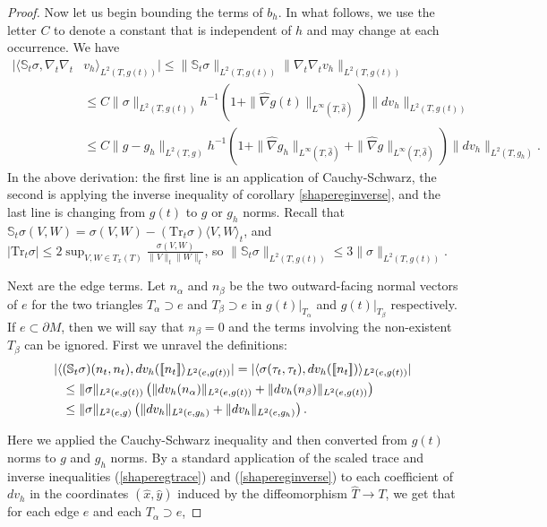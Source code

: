 \documentclass[11pt]{article}
\newcommand{\iprod}[1]{\langle #1 \rangle}
\begin{document}
\begin{proof}
Now let us begin bounding the terms of $b_h$. In what follows, we use the letter $C$ to denote a constant that is independent of $h$ and may change at each occurrence.  We have
\begin{align*}|\iprod{\mathbb{S}_t\sigma,\nabla_t\nabla_t & v_h}_{L^2(T,g(t))}| \le \|\mathbb{S}_t\sigma\|_{L^2(T,g(t))}\|\nabla_t\nabla_t v_h\|_{L^2(T,g(t))}\\
&\le C \|\sigma\|_{L^2(T,g(t))}h^{-1}\left(1 + \|\hat \nabla g(t)\|_{L^\infty(T,\hat \delta)}\right)\|dv_h\|_{L^2(T,g(t))} \\
&\le C\|g - g_h\|_{L^2(T,g)}h^{-1}\left(1 + \|\hat \nabla g_h\|_{L^\infty(T,\hat \delta)} + \|\hat \nabla g\|_{L^\infty(T,\hat \delta)}\right)\|dv_h\|_{L^2(T,g_h)}.
\end{align*}
In the above derivation: the first line is an application of Cauchy-Schwarz, the second is applying the inverse inequality of corollary \ref{shapereginverse}, and the last line is changing from $g(t)$ to $g$ or $g_h$ norms. Recall that $\mathbb{S}_t\sigma(V,W) = \sigma(V,W) - (\mathrm{Tr}_t\sigma)\iprod{V,W}_t$, and $|\mathrm{Tr}_t\sigma| \le 2 \sup_{V,W \in T_x(T)} \frac{\sigma(V,W)}{\|V\|_t\|W\|_t}$, so $\|\mathbb{S}_t\sigma\|_{L^2(T,g(t))} \le 3\|\sigma\|_{L^2(T,g(t))}$.

Next are the edge terms. Let $n_\alpha$ and $n_\beta$ be the two outward-facing normal vectors of $e$ for the two triangles $T_\alpha \supset e$ and $T_\beta \supset e$ in $g(t)|_{T_\alpha}$ and $g(t)|_{T_\beta}$ respectively. If $e \subset \partial M$, then we will say that $n_\beta = 0$ and the terms involving the non-existent $T_\beta$ can be ignored.  First we unravel the definitions:
\begin{align}
|\iprod{&(\mathbb{S}_t\sigma)(n_t,n_t),dv_h([\![n_t]\!]}_{L^2(e,g(t))}| = |\iprod{\sigma(\tau_t,\tau_t),dv_h([\![n_t]\!])}_{L^2(e,g(t))}|\notag \\
&\le \|\sigma\|_{L^2(e,g(t))}\left(\|dv_h(n_\alpha)\|_{L^2(e,g(t))} + \|dv_h(n_\beta)\|_{L^2(e,g(t))}\right) \notag \\
&\le \|\sigma\|_{L^2(e,g)}\left(\|dv_h\|_{L^2(e,g_h)} + \|dv_h\|_{L^2(e,g_h)}\right). \label{edgeeqn}\end{align}

Here we applied the Cauchy-Schwarz inequality and then converted from $g(t)$ norms to $g$ and $g_h$ norms. By a standard application of the scaled trace and inverse inequalities (\ref{shaperegtrace}) and (\ref{shapereginverse}) to each coefficient of $dv_h$ in the coordinates $(\hat{x},\hat{y})$ induced by the diffeomorphism $\hat{T} \to T$, we get that for each edge $e$ and each $T_\alpha \supset e$,


\end{proof}
\end{document}
